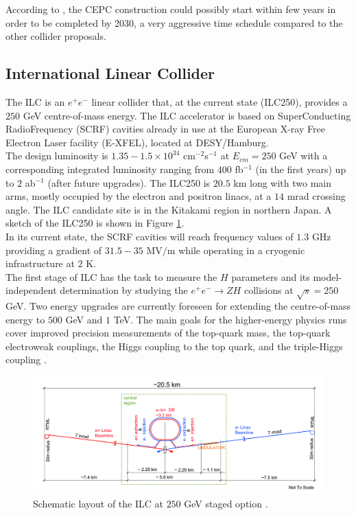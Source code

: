According to \cite{CEPC_schedule}, the CEPC construction could possibly start within few years in order to be completed by 2030, a very aggressive time schedule compared to the other collider proposals.

\subsection*{International Linear Collider}
The ILC is an $e^+e^-$ linear collider that, at the current state (ILC250), provides a $250$ GeV centre-of-mass energy.
The ILC accelerator is based on SuperConducting RadioFrequency (SCRF) cavities already in use at the European X-ray Free Electron Laser facility (E-XFEL), located at DESY/Hamburg.\\

The design luminosity is $1.35-1.5 \times 10^{34}$ cm$^{-2}$s$^{-1}$ at $E_{cm} = 250$ GeV with a corresponding integrated luminosity ranging from $400$ fb$^{-1}$ (in the first years) up to $2$ ab$^{-1}$ (after future upgrades).
The ILC250 is $20.5$ km long with two main arms, mostly occupied by the electron and positron linacs, at a $14$ mrad crossing angle. The ILC candidate site is in the Kitakami region in northern Japan. A sketch of the ILC250 is shown in Figure \ref{fig:ILC250}.\\
In its current state, the SCRF cavities will reach frequency values of $1.3$ GHz providing a gradient of $31.5-35$ MV$/$m while operating in a cryogenic infrastructure at $2$ K.\\

The first stage of ILC has the task to measure the $H$ parameters and its model-independent determination by studying the $e^+e^- \rightarrow ZH$ collisions at $\sqrt{s}= 250$ GeV.
Two energy upgrades are currently foreseen for extending the centre-of-mass energy to $500$ GeV and $1$ TeV.
The main goals for the higher-energy physics runs cover improved precision measurements of the top-quark mass, the top-quark electroweak couplings, the Higgs coupling to the top quark, and the triple-Higgs coupling \cite{ILC_global_project}.\\

\begin{figure}
	\centering
	\includegraphics[width=.8\textwidth]{IMG/Cap1/ILC.png}
	\caption{Schematic layout of the ILC at $250$ GeV staged option \cite{ILC_global_project}.}
	\label{fig:ILC250}
\end{figure}

